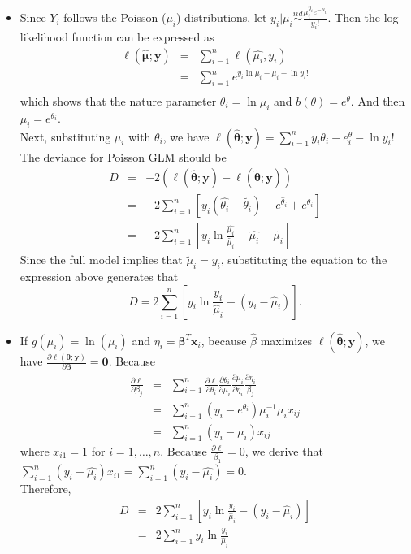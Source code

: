 \documentclass[]{article}
\begin{document}
\begin{enumerate}
{\item[Sol. 1]
\begin{itemize}
	\item[(a)] Since $Y_i$ follows the Poisson ($\mu_i$) distributions, let $y_i|\mu_i\stackrel{iid}{\sim}\frac{\mu_i^{y_i} e^{-\mu_i}}{y_i!}$.
	Then the log-likelihood function can be expressed as
	\begin{eqnarray}
	\ell(\hat{\bm{\mu}};\bm{y}) & = & \sum_{i = 1}^{n} \ell(\hat{\mu_i},y_i)\\
	& = & \sum_{i = 1}^{n} e^{y_i\ln \mu_i - \mu_i - \ln y_i!}\\
	\end{eqnarray}
	which shows that the nature parameter $\theta_i = \ln\mu_i$ and $b(\theta) = e^\theta$. And then $\mu_i = e^{\theta_i}$.\\
	Next, substituting $\mu_i$ with $\theta_i$, we have $\ell(\hat{\bm{\theta}};\bm{y}) = \sum_{i=1}^{n}y_i\theta_i-e^\theta_i-\ln y_i!$\\
	The deviance for Poisson GLM should be
	\begin{eqnarray}
	D & = & -2(\ell(\hat{\bm{\theta}};\bm{y})-\ell(\tilde{\bm{\theta}};\bm{y})) \\
	& = & -2\sum_{i = 1}^{n}[y_i(\hat{\theta_i}-\tilde{\theta_i})-e^{\hat{\theta}_i}+e^{\tilde{\theta}_i}]\\
	& = & -2\sum_{i = 1}^{n}[y_i\ln\frac{\hat{\mu_i}}{\tilde{\mu_i}}-\hat{\mu_i}+\tilde{\mu_i}]
	\end{eqnarray}
	Since the full model implies that $\tilde{\mu}_i = y_i$, substituting the equation to the expression above generates that 
	\begin{equation}
	D = 2\sum_{i=1}^{n}[y_i\ln\frac{y_i}{\hat{\mu}_i}-(y_i-\hat{\mu}_i)].
	\end{equation}
	\item[(b)] If $g(\mu_i) = \ln(\mu_i)$ and $\eta_i = \bm{\beta}^T\bm{x}_i$, because $\hat{\beta}$ maximizes $\ell(\hat{\bm{\theta}};\bm{y})$, we have $\frac{\partial\ell(\bm{\theta};\bm{y})}{\partial\bm{\beta}} = \bm{0}$. Because 
	\begin{eqnarray}
	\frac{\partial\ell}{\partial\beta_j} & = & \sum_{i = 1}^{n}\frac{\partial\ell}{\partial\theta_i}\frac{\partial\theta_i}{\partial\mu_i}\frac{\partial\mu_i}{\partial\eta_i}\frac{\partial\eta_i}{\beta_j} \\
	& = & \sum_{i = 1}^{n}(y_i-e^{\theta_i})\mu_i^{-1}\mu_i x_{ij} \\
	& = & \sum_{i = 1}^{n}(y_i-\mu_i) x_{ij}
	\end{eqnarray}
	where $x_{i1} = 1$ for $i = 1,\ldots,n$. Because $\frac{\partial\ell}{\beta_1} = 0$, we derive that $\sum_{i = 1}^{n}(y_i-\hat{\mu_i}) x_{i1} = \sum_{i = 1}^{n}(y_i-\hat{\mu_i}) = 0$.\\
	Therefore, 
	\begin{eqnarray}
	D & = & 2\sum_{i=1}^{n}[y_i\ln\frac{y_i}{\hat{\mu}_i}-(y_i-\hat{\mu}_i)] \\
	& = & 2\sum_{i=1}^{n}y_i\ln\frac{y_i}{\hat{\mu}_i}
	\end{eqnarray}
\end{itemize}

}
\end{enumerate}
\end{document}
